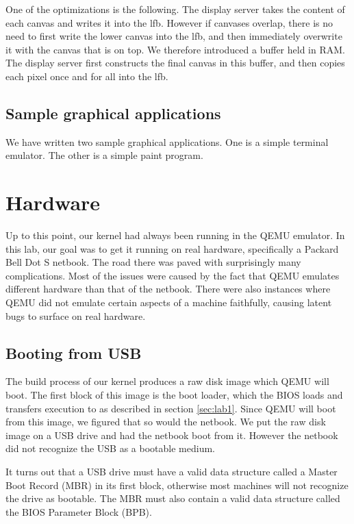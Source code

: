 \documentclass{report}
\begin{document}
One of the optimizations is the following. The display server takes the
content of each canvas and writes it into the \gls{lfb}. However if
canvases overlap, there is no need to first write the lower canvas into the
\gls{lfb}, and then immediately overwrite it with the canvas that is on top.
We therefore introduced a buffer held in RAM. The display server first
constructs the final canvas in this buffer, and then copies each pixel once
and for all into the \gls{lfb}.



\section{Sample graphical applications}
We have written two sample graphical applications. One is a simple terminal
emulator. The other is a simple paint program.




\chapter{Hardware}
Up to this point, our kernel had always been running in the QEMU emulator. In
this lab, our goal was to get it running on real hardware, specifically a
Packard Bell Dot S netbook. The road there was paved with surprisingly many
complications. Most of the issues were caused by the fact that QEMU emulates
different hardware than that of the netbook. There were also instances where
QEMU did not emulate certain aspects of a machine faithfully, causing latent
bugs to surface on real hardware.


\section{Booting from USB}
The build process of our kernel produces a raw disk image which QEMU will
boot. The first block of this image is the boot loader, which the BIOS loads
and transfers execution to as described in section \ref{sec:lab1}. Since QEMU
will boot from this image, we figured that so would the netbook. We put the
raw disk image on a USB drive and had the netbook boot from it. However the
netbook did not recognize the USB as a bootable medium.

It turns out that a USB drive must have a valid data structure called a Master
Boot Record (MBR) in its first block, otherwise most machines will not
recognize the drive as bootable. The MBR must also contain a valid data
structure called the BIOS Parameter Block (BPB).
\end{document}
